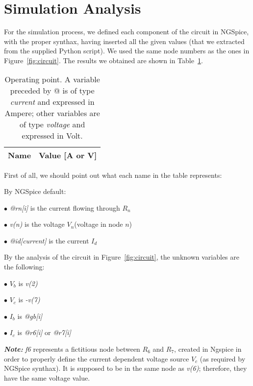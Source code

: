 \section{Simulation Analysis}
\label{sec:simulation}
For the simulation process, we defined each component of the circuit in NGSpice, with the proper synthax, having inserted all the given values (that we extracted from the supplied Python script). We used the same node numbers as the ones in Figure~\ref{fig:circuit}. The results we obtained are shown in Table~\ref{tab:op}.

\begin{table}[h]
  \centering
  \begin{tabular}{|l|r|}
    \hline    
    {\bf Name} & {\bf Value [A or V]} \\ \hline
    
  \end{tabular}
  \caption{Operating point. A variable preceded by @ is of type {\em current}
		and expressed in Ampere; other variables are of type {\it voltage} and expressed in
		Volt.}
  \label{tab:op}
\end{table}

First of all, we should point out what each name in the table represents:
\vspace{0.2cm}

By NGSpice default:

$\bullet$ \textit{@rn[i]} is the current flowing through $R_n$

$\bullet$ \textit{v(n)} is the voltage $V_n$(voltage in node $n$)

$\bullet$ \textit{@id[current]} is the current $I_d$
\vspace{.2cm}

By the analysis of the circuit in Figure~\ref{fig:circuit}, the unknown variables are the following:

$\bullet$ $V_b$ is \textit{v(2)}

$\bullet$ $V_c$ is \textit{-v(7)}

$\bullet$ $I_b$ is \textit{@gb[i]} 

$\bullet$ $I_c$ is \textit{@r6[i]} or \textit{@r7[i]}
\vspace{.2cm}

\textbf{\textit{Note:}} \textit{f6} represents a fictitious node between $R_6$ and $R_7$, created in Ngspice in order to properly define the current dependent voltage source $V_c$ (as required by NGSpice synthax). It is supposed to be in the same node as \textit{v(6)}; therefore, they have the same voltage value.
\vspace{.5cm}

